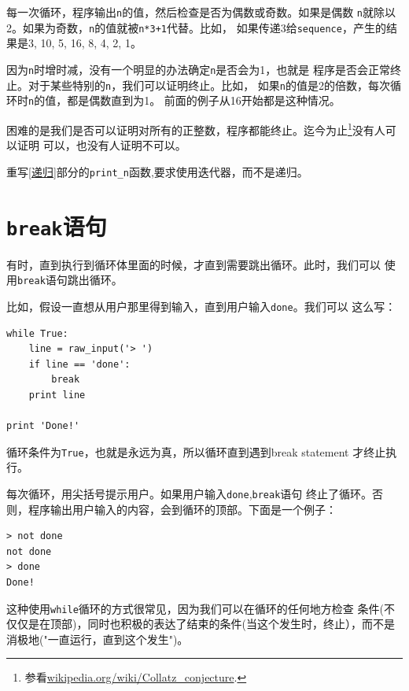 每一次循环，程序输出{\tt n}的值，然后检查是否为偶数或奇数。如果是偶数
{\tt n}就除以2。如果为奇数，{\tt n}的值就被{\tt n*3+1}代替。比如，
如果传递3给{\tt sequence}，产生的结果是3, 10, 5, 16, 8, 4, 2, 1。

因为{\tt n}时增时减，没有一个明显的办法确定{\tt n}是否会为1，也就是
程序是否会正常终止。对于某些特别的{\tt n}，我们可以证明终止。比如，
如果{\tt n}的值是2的倍数，每次循环时{\tt n}的值，都是偶数直到为1。
前面的例子从16开始都是这种情况。


困难的是我们是否可以证明对所有的正整数，程序都能终止。迄今为止\footnote{参看\url{wikipedia.org/wiki/Collatz_conjecture}.}没有人可以证明
可以，也没有人证明不可以。

\begin{ex}
重写\ref{递归}部分的\verb"print_n"函数,要求使用迭代器，而不是递归。
\end{ex}

\section{{\tt break}语句}

有时，直到执行到循环体里面的时候，才直到需要跳出循环。此时，我们可以
使用{\tt break}语句跳出循环。

比如，假设一直想从用户那里得到输入，直到用户输入{\tt done}。我们可以
这么写：

\beforeverb
\begin{verbatim}
while True:
    line = raw_input('> ')
    if line == 'done':
        break
    print line

print 'Done!'
\end{verbatim}
\afterverb

循环条件为{\tt True}，也就是永远为真，所以循环直到遇到break statement
才终止执行。

每次循环，用尖括号提示用户。如果用户输入{\tt done},{\tt break}语句
终止了循环。否则，程序输出用户输入的内容，会到循环的顶部。下面是一个例子：

\beforeverb
\begin{verbatim}
> not done
not done
> done
Done!
\end{verbatim}
\afterverb
%

这种使用{\tt while}循环的方式很常见，因为我们可以在循环的任何地方检查
条件(不仅仅是在顶部)，同时也积极的表达了结束的条件(当这个发生时，终止），而不是消极地("一直运行，直到这个发生")。

